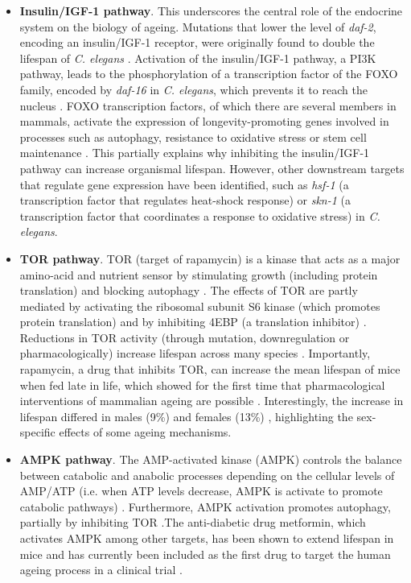 \begin{itemize} 

	\item \textbf{Insulin/\acrshort{IGF-1} pathway}. This underscores the central role of the endocrine system on the biology of ageing. Mutations that lower the level of \textit{daf-2}, encoding an insulin/IGF-1 receptor, were originally found to double the lifespan of \textit{C. elegans} \cite{Kenyon1993,Guarente2000}. Activation of the insulin/IGF-1 pathway, a PI3K pathway, leads to the phosphorylation of a transcription factor of the FOXO family, encoded by \textit{daf-16} in \textit{C. elegans}, which prevents it to reach the nucleus \cite{Lin2001}. FOXO transcription factors, of which there are several members in mammals, activate the expression of longevity-promoting genes involved in processes such as autophagy, resistance to oxidative stress or stem cell maintenance \cite{Martins2016}. This partially explains why inhibiting the insulin/IGF-1 pathway can increase organismal lifespan. However, other downstream targets that regulate gene expression have been identified, such as \textit{hsf-1} (a transcription factor that regulates heat-shock response) \cite{Hsu2003} or \textit{skn-1} (a transcription factor that coordinates a response to oxidative stress) \cite{Tullet2008} in \textit{C. elegans}.
	
	\item \textbf{\acrshort{TOR} pathway}. \acrshort{TOR} (target of rapamycin) is a kinase that acts as a major amino-acid and nutrient sensor by stimulating growth (including protein translation) and blocking autophagy \cite{Kenyon2010}. The effects of TOR are partly mediated by activating the ribosomal subunit S6 kinase (which promotes protein translation) and by inhibiting 4EBP (a translation inhibitor)  \cite{Kenyon2010,Um2006}. Reductions in TOR activity (through mutation, downregulation or pharmacologically) increase lifespan across many species \cite{Kenyon2010}. Importantly, rapamycin, a drug that inhibits TOR, can increase the mean lifespan of mice when fed late in life, which showed for the first time that pharmacological interventions of mammalian ageing are possible \cite{Harrison2009}. Interestingly, the increase in lifespan differed in males (9\%) and females (13\%) \cite{Harrison2009}, highlighting the sex-specific effects of some ageing mechanisms. 
	
	\item \textbf{AMPK pathway}. The AMP-activated kinase (\acrshort{AMPK}) controls the balance between catabolic and anabolic processes depending on the cellular levels of \acrshort{AMP}/\acrshort{ATP} (i.e. when ATP levels decrease, AMPK is activate to promote catabolic pathways) \cite{Kenyon2010,Mihaylova2011}. Furthermore, AMPK activation promotes autophagy, partially by inhibiting TOR \cite{Mihaylova2011}.The anti-diabetic drug metformin, which activates AMPK among other targets, has been shown to extend lifespan in mice \cite{Anisimov2008,Martin-Montalvo2013} and has currently been included as the first drug to target the human ageing process in a clinical trial \cite{Barzilai2016}.
		

\end{itemize}
